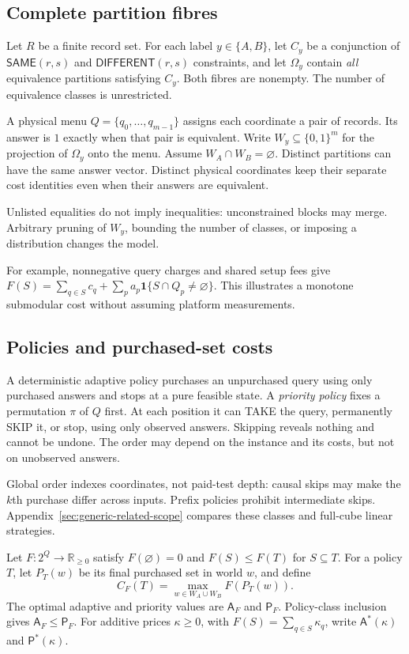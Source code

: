 \documentclass[pdflatex,sn-mathphys-num]{sn-jnl}
\newcommand{\A}{\mathsf{A}}
\newcommand{\Pcost}{\mathsf{P}}
\newcommand{\SAME}{\mathsf{SAME}}
\newcommand{\DIFF}{\mathsf{DIFFERENT}}
\theoremstyle{thmstyleone}
\theoremstyle{thmstylethree}
\theoremstyle{thmstyletwo}
\begin{document}
\subsection{Complete partition fibres}
Let $R$ be a finite record set. For each label $y\in\{A,B\}$, let $C_y$ be a conjunction of $\SAME(r,s)$ and $\DIFF(r,s)$ constraints, and let $\Omega_y$ contain \emph{all} equivalence partitions satisfying $C_y$. Both fibres are nonempty. The number of equivalence classes is unrestricted.

A physical menu $Q=\{q_0,\ldots,q_{m-1}\}$ assigns each coordinate a pair of records. Its answer is $1$ exactly when that pair is equivalent. Write $W_y\subseteq\{0,1\}^m$ for the projection of $\Omega_y$ onto the menu. Assume $W_A\cap W_B=\varnothing$. Distinct partitions can have the same answer vector. Distinct physical coordinates keep their separate cost identities even when their answers are equivalent.

Unlisted equalities do not imply inequalities: unconstrained blocks may merge. Arbitrary pruning of $W_y$, bounding the number of classes, or imposing a distribution changes the model.

For example, nonnegative query charges and shared setup fees give
$F(S)=\sum_{q\in S}c_q+\sum_p a_p\mathbf1\{S\cap Q_p\ne\varnothing\}$.
This illustrates a monotone submodular cost without assuming platform measurements.

\subsection{Policies and purchased-set costs}
A deterministic adaptive policy purchases an unpurchased query using only purchased answers and stops at a pure feasible state. A \emph{priority policy} fixes a permutation $\pi$ of $Q$ first. At each position it can TAKE the query, permanently SKIP it, or stop, using only observed answers. Skipping reveals nothing and cannot be undone. The order may depend on the instance and its costs, but not on unobserved answers.

Global order indexes coordinates, not paid-test depth: causal skips may make the $k$th purchase differ across inputs. Prefix policies prohibit intermediate skips. Appendix~\ref{sec:generic-related-scope} compares these classes and full-cube linear strategies.

Let $F:2^Q\to\mathbb R_{\geq0}$ satisfy $F(\varnothing)=0$ and $F(S)\leq F(T)$ for $S\subseteq T$. For a policy $T$, let $P_T(w)$ be its final purchased set in world $w$, and define
\[
 C_F(T)=\max_{w\in W_A\cup W_B} F(P_T(w)).
\]
The optimal adaptive and priority values are $\A_F$ and $\Pcost_F$. Policy-class inclusion gives $\A_F\leq\Pcost_F$. For additive prices $\kappa\geq0$, with $F(S)=\sum_{q\in S}\kappa_q$, write $\A^*(\kappa)$ and $\Pcost^*(\kappa)$.
\end{document}
